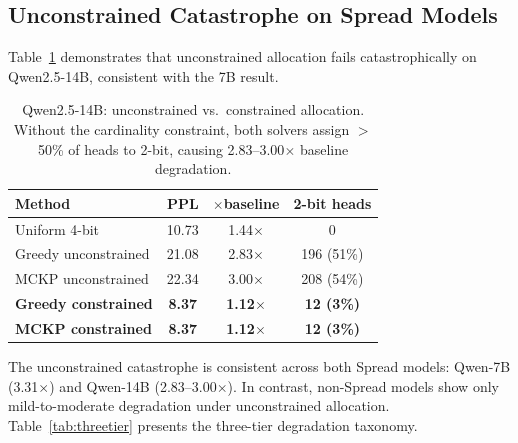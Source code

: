 \documentclass[11pt,a4paper]{article}
\begin{document}
\subsection{Unconstrained Catastrophe on Spread Models}
\label{sec:unconstrained}

Table~\ref{tab:unconstrained14b} demonstrates that unconstrained allocation fails catastrophically on Qwen2.5-14B, consistent with the 7B result.

\begin{table}[h]
\centering
\caption{Qwen2.5-14B: unconstrained vs.\ constrained allocation. Without the cardinality constraint, both solvers assign $>$50\% of heads to 2-bit, causing 2.83--3.00$\times$ baseline degradation.}
\label{tab:unconstrained14b}
\begin{tabular}{lccc}
\toprule
\textbf{Method} & \textbf{PPL} & $\boldsymbol{\times}$\textbf{baseline} & \textbf{2-bit heads} \\
\midrule
Uniform 4-bit           & 10.73           & 1.44$\times$ & 0            \\
Greedy unconstrained    & 21.08           & 2.83$\times$ & 196 (51\%)   \\
MCKP unconstrained      & 22.34           & 3.00$\times$ & 208 (54\%)   \\
\textbf{Greedy constrained}  & \textbf{8.37}  & \textbf{1.12$\times$} & \textbf{12 (3\%)} \\
\textbf{MCKP constrained}    & \textbf{8.37}  & \textbf{1.12$\times$} & \textbf{12 (3\%)} \\
\bottomrule
\end{tabular}
\end{table}

The unconstrained catastrophe is consistent across both Spread models: Qwen-7B (3.31$\times$) and Qwen-14B (2.83--3.00$\times$).
In contrast, non-Spread models show only mild-to-moderate degradation under unconstrained allocation.
Table~\ref{tab:threetier} presents the three-tier degradation taxonomy.
\end{document}
